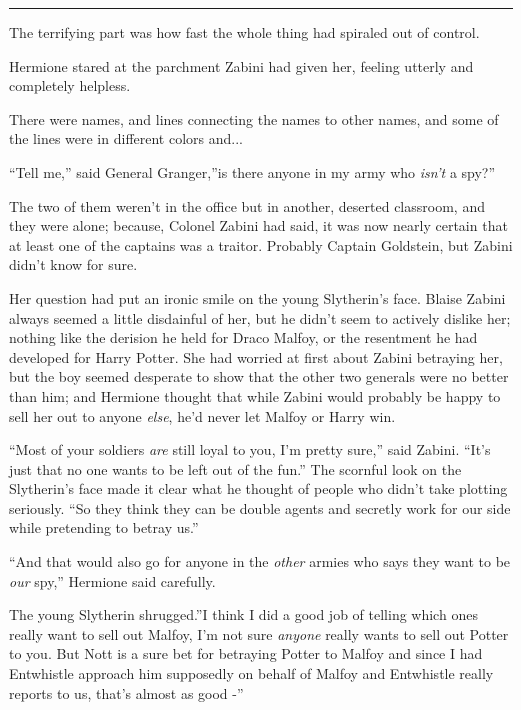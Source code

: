 \begin{center}\rule{3in}{0.4pt}\end{center}

The terrifying part was how fast the whole thing had spiraled out of
control.

Hermione stared at the parchment Zabini had given her, feeling utterly
and completely helpless.

There were names, and lines connecting the names to other names, and
some of the lines were in different colors and...

``Tell me,'' said General Granger,''is there anyone in my army who
\emph{isn't} a spy?''

The two of them weren't in the office but in another, deserted
classroom, and they were alone; because, Colonel Zabini had said, it was
now nearly certain that at least one of the captains was a traitor.
Probably Captain Goldstein, but Zabini didn't know for sure.

Her question had put an ironic smile on the young Slytherin's face.
Blaise Zabini always seemed a little disdainful of her, but he didn't
seem to actively dislike her; nothing like the derision he held for
Draco Malfoy, or the resentment he had developed for Harry Potter. She
had worried at first about Zabini betraying her, but the boy seemed
desperate to show that the other two generals were no better than him;
and Hermione thought that while Zabini would probably be happy to sell
her out to anyone \emph{else}, he'd never let Malfoy or Harry win.

``Most of your soldiers \emph{are} still loyal to you, I'm pretty sure,''
said Zabini. ``It's just that no one wants to be left out of the fun.''
The scornful look on the Slytherin's face made it clear what he thought
of people who didn't take plotting seriously. ``So they think they can
be double agents and secretly work for our side while pretending to
betray us.''

``And that would also go for anyone in the \emph{other} armies who says
they want to be \emph{our} spy,'' Hermione said carefully.

The young Slytherin shrugged.''I think I did a good job of telling which
ones really want to sell out Malfoy, I'm not sure \emph{anyone} really
wants to sell out Potter to you. But Nott is a sure bet for betraying
Potter to Malfoy and since I had Entwhistle approach him supposedly on
behalf of Malfoy and Entwhistle really reports to us, that's almost as
good -''

